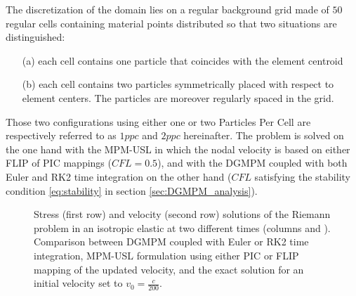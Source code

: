 The discretization of the domain lies on a regular background grid made of $50$ regular cells containing material points distributed so that two situations are distinguished:
\begin{itemize}
\item[(a)] each cell contains one particle that coincides with the element centroid
\item[(b)] each cell contains two particles symmetrically placed with respect to element centers. The particles are moreover regularly spaced in the grid.
\end{itemize}
Those two configurations using either one or two Particles Per Cell are respectively referred to as $1ppc$ and $2ppc$ hereinafter.
The problem is solved on the one hand with the MPM-USL in which the nodal velocity is based on either FLIP of PIC mappings ($CFL=0.5$), and with the DGMPM coupled with both Euler and RK2 time integration on the other hand ($CFL$ satisfying the stability condition \eqref{eq:stability} in section \ref{sec:DGMPM_analysis}).
\begin{figure}[h!]
  \centering
  { \label{subfig:rp_elastic1}}
  { \label{subfig:rp_elastic2}}
  
  \caption{Stress (first row) and velocity (second row) solutions of the Riemann problem in an isotropic elastic at two different times (columns  and ). Comparison between DGMPM coupled with Euler or RK2 time integration, MPM-USL formulation using either PIC or FLIP mapping of the updated velocity, and the exact solution for an initial velocity set to $v_0=\frac{c}{200}$.}
  \label{fig:elastic_stress}
\end{figure}
